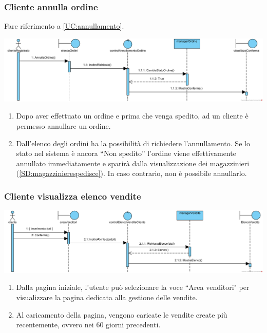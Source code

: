 \documentclass[12pt,a4paper]{article}
\begin{document}
\subsubsection{Cliente annulla ordine}
\label{SD:annull}

Fare riferimento a \ref{UC:annullamento}. \\

\begin{center}
\includegraphics[width=\textwidth]{SequenceDiagram/ClienteOrdineAnnulla}
\end{center}

\begin{enumerate}
\item Dopo aver effettuato un ordine e prima che venga spedito, ad un cliente è permesso annullare un ordine.
\item Dall'elenco degli ordini ha la possibilità di richiedere l'annullamento. Se lo stato nel sistema è ancora ``Non spedito'' l'ordine viene effettivamente annullato immediatamente e sparirà dalla visualizzazione dei magazzinieri (\ref{SD:magazzinierespedisce}). In caso contrario, non è possibile annullarlo.
\end{enumerate}

\newpage

\subsubsection{Cliente visualizza elenco vendite}
\label{SD:elencovendite}

\begin{center}
\includegraphics[width=\textwidth]{SequenceDiagram/ClienteVenditaRicerca}
\end{center}

\begin{enumerate}
\item Dalla pagina iniziale, l'utente può selezionare la voce ``Area venditori" per visualizzare la pagina dedicata alla gestione delle vendite.
\item Al caricamento della pagina, vengono caricate le vendite create più recentemente, ovvero nei 60 giorni precedenti.
\end{enumerate}
\end{document}

